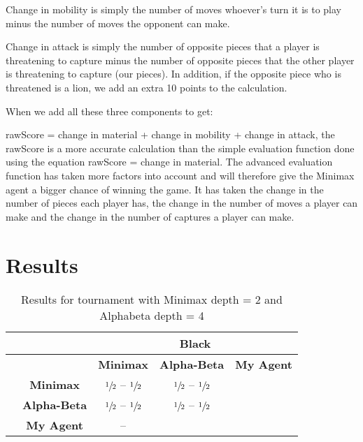\documentclass[twocolumn]{article}
\begin{document}
Change in mobility is simply the number of moves whoever’s turn it is to play minus the number of moves the opponent can make.

Change in attack is simply the number of opposite pieces that a player is threatening to capture minus the number of opposite pieces that the other player is threatening to capture (our pieces). In addition, if the opposite piece who is threatened is a lion, we add an extra 10 points to the calculation.

When we add all these three components to get:

rawScore = change in material + change in mobility + change in attack, the rawScore is a more accurate calculation than the simple evaluation function done using the equation rawScore = change in material. The advanced evaluation function has taken more factors into account and will therefore give the Minimax agent a bigger chance of winning the game. It has taken the change in the number of pieces each player has, the change in the number of moves a player can make and the change in the number of captures a player can make. 

\section{Results}

\begin{table}[h!]
\centering
\begin{tabular}{|c|c|c|c|c|}
\hline
                       &                     & \multicolumn{3}{c|}{Black}                                           \\ \hline
                       &                     & \textbf{Minimax} & \textbf{Alpha-Beta}           & \textbf{My Agent} \\ \hline
\parbox[t]{2mm}{} & \textbf{Minimax}    & $\sfrac{1}{2}$ -- $\sfrac{1}{2}$                & $\sfrac{1}{2}$ -- $\sfrac{1}{2}$ &                \\  
                       & \textbf{Alpha-Beta} & $\sfrac{1}{2}$ -- $\sfrac{1}{2}$              & $\sfrac{1}{2}$ -- $\sfrac{1}{2}$               \\  
                       & \textbf{My Agent}                            & --                 \\ \hline
\end{tabular}
\caption{Results for tournament with Minimax depth = 2 and Alphabeta depth = 4}
\end{table}
\end{document}
